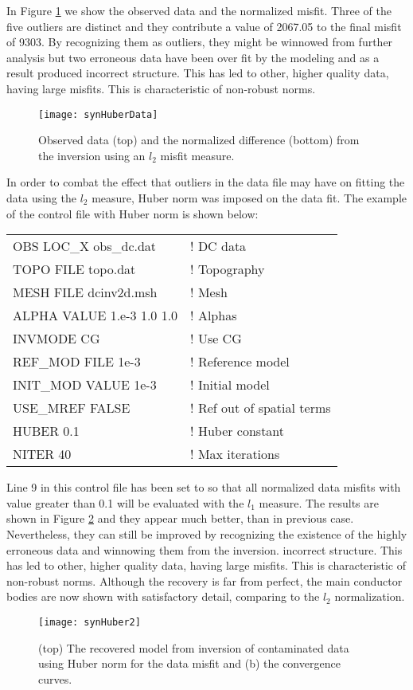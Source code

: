 In Figure \ref{fig:synHuberData} we show the observed data and the normalized misfit. Three of the five outliers are distinct and they contribute a value of 2067.05 to the final misfit of 9303. By recognizing them as outliers, they might be winnowed from further analysis but two erroneous data have been over fit by the modeling and as a result produced incorrect structure. This has led to other, higher quality data, having large misfits. This is characteristic of non-robust norms.
%
\begin{figure}
\centering
\texttt{[image: synHuberData]}
\caption{Observed data (top) and the normalized difference (bottom) from the inversion using an $l_2$ misfit measure.}
\label{fig:synHuberData}
\end{figure}

In order to combat the effect that outliers in the data file may have on fitting the data using the $l_2$ measure, Huber norm was imposed on the data fit. The example of the control file with Huber norm is shown below:
%
\begin{fileExample}
\begin{tabular}{|ll|}
\hline
OBS LOC\_X obs\_dc.dat & ! DC data \\
TOPO FILE topo.dat & ! Topography\\
MESH FILE dcinv2d.msh & ! Mesh \\
ALPHA VALUE 1.e-3 1.0 1.0 & ! Alphas \\
INVMODE CG & ! Use CG \\
REF\_MOD FILE 1e-3 & ! Reference model \\
INIT\_MOD VALUE 1e-3 & ! Initial model \\
USE\_MREF FALSE & ! Ref out of spatial terms \\
HUBER 0.1 & ! Huber constant \\
NITER 40 & ! Max iterations \\
\hline
\end{tabular}
\end{fileExample}
%
Line 9 in this control file has been set to so that all normalized data misfits with value greater than 0.1 will be evaluated with the $l_1$ measure. The results are shown in Figure \ref{fig:synInvHuber2} and they appear much better, than in previous case. Nevertheless, they can still be improved by recognizing the existence of the highly erroneous data and winnowing them from the inversion.
incorrect structure. This has led to other, higher quality data, having large misfits. This is characteristic of non-robust norms. Although the recovery is far from perfect, the main conductor bodies are now shown with satisfactory detail, comparing to the $l_2$ normalization.
%
\begin{figure}
\centering
\texttt{[image: synHuber2]}
\caption{(top) The recovered model from inversion of contaminated data using Huber norm for the data misfit and (b) the convergence curves.}
\label{fig:synInvHuber2}
\end{figure}

